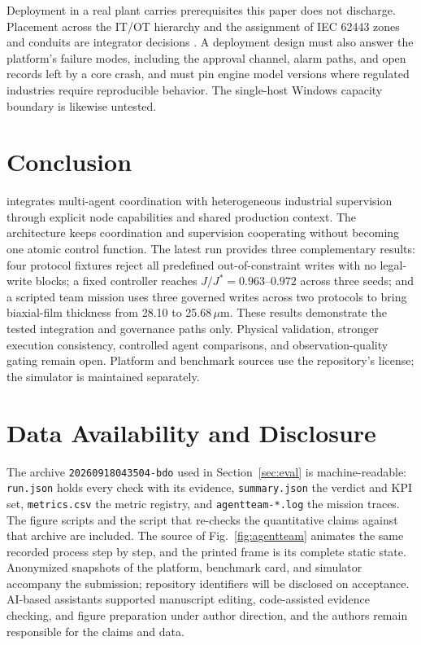 Deployment in a real plant carries prerequisites this paper does not discharge.
Placement
across the IT/OT hierarchy and the assignment of IEC 62443 zones and conduits are
integrator decisions \cite{iec62443}. A deployment design must also answer the
platform's failure modes, including the approval channel, alarm paths, and open
records left by a core crash, and must pin engine model versions where regulated
industries require reproducible behavior. The single-host Windows capacity boundary
is likewise untested.

\section{Conclusion}
\label{sec:conclusion}
\system{} integrates multi-agent coordination with heterogeneous industrial
supervision through explicit node capabilities and shared production context. The
architecture keeps coordination and supervision cooperating without becoming one atomic control
function. The latest run provides three
complementary results: four protocol fixtures reject all predefined
out-of-constraint writes with no legal-write blocks; a fixed controller reaches
$J/J^*=0.963$--$0.972$ across three seeds; and a scripted team mission uses three
governed writes across two protocols to bring biaxial-film thickness from 28.10 to
25.68\,$\mu$m. These results demonstrate the tested integration and governance
paths only. Physical validation, stronger execution consistency, controlled agent comparisons,
and observation-quality gating remain open. Platform and benchmark sources use the
repository's license; the simulator is maintained separately.

\section*{Data Availability and Disclosure}
The archive \texttt{20260918043504-bdo} used in Section~\ref{sec:eval} is
machine-readable: \texttt{run.json} holds every check with its evidence,
\texttt{summary.json} the verdict and KPI set, \texttt{metrics.csv} the metric
registry, and \texttt{agentteam-*.log} the mission traces. The figure scripts and
the script that re-checks the quantitative claims against that archive are
included. The source of Fig.~\ref{fig:agentteam} animates the same recorded process step by
step, and the printed frame is its complete static state. Anonymized snapshots of
the platform, benchmark card, and simulator accompany the submission; repository
identifiers will be disclosed on acceptance. AI-based assistants supported
manuscript editing, code-assisted evidence checking, and figure preparation under
author direction, and the authors remain responsible for the claims and data.
